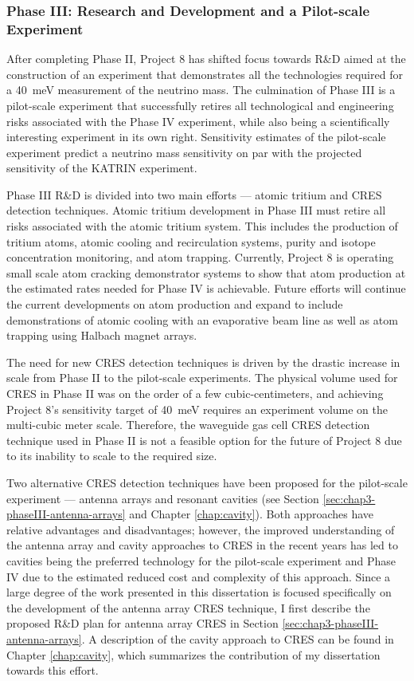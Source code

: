 \subsubsection*{Phase III: Research and Development and a Pilot-scale Experiment}

After completing Phase II, Project 8 has shifted focus towards R\&D aimed at the construction of an experiment that demonstrates all the technologies required for a 40~meV measurement of the neutrino mass. The culmination of Phase III is a pilot-scale experiment that successfully retires all technological and engineering risks associated with the Phase IV experiment, while also being a scientifically interesting experiment in its own right. Sensitivity estimates of the pilot-scale experiment predict a neutrino mass sensitivity on par with the projected sensitivity of the KATRIN experiment. 

Phase III R\&D is divided into two main efforts --- atomic tritium and CRES detection techniques. Atomic tritium development in Phase III must retire all risks associated with the atomic tritium system. This includes the production of tritium atoms, atomic cooling and recirculation systems, purity and isotope concentration monitoring, and atom trapping. Currently, Project 8 is operating small scale atom cracking demonstrator systems to show that atom production at the estimated rates needed for Phase IV is achievable. Future efforts will continue the current developments on atom production and expand to include demonstrations of atomic cooling with an evaporative beam line as well as atom trapping using Halbach magnet arrays.

The need for new CRES detection techniques is driven by the drastic increase in scale from Phase II to the pilot-scale experiments. The physical volume used for CRES in Phase II was on the order of a few cubic-centimeters, and achieving Project 8's sensitivity target of 40~meV requires an experiment volume on the multi-cubic meter scale. Therefore, the waveguide gas cell CRES detection technique used in Phase II is not a feasible option for the future of Project 8 due to its inability to scale to the required size.

Two alternative CRES detection techniques have been proposed for the pilot-scale experiment --- antenna arrays and resonant cavities (see Section \ref{sec:chap3-phaseIII-antenna-arrays} and Chapter \ref{chap:cavity}). Both approaches have relative advantages and disadvantages; however, the improved understanding of the antenna array and cavity approaches to CRES in the recent years has led to cavities being the preferred technology for the pilot-scale experiment and Phase IV due to the estimated reduced cost and complexity of this approach. Since a large degree of the work presented in this dissertation is focused specifically on the development of the antenna array CRES technique, I first describe the proposed R\&D plan for antenna array CRES in Section \ref{sec:chap3-phaseIII-antenna-arrays}. A description of the cavity approach to CRES can be found in Chapter \ref{chap:cavity}, which summarizes the contribution of my dissertation towards this effort.

